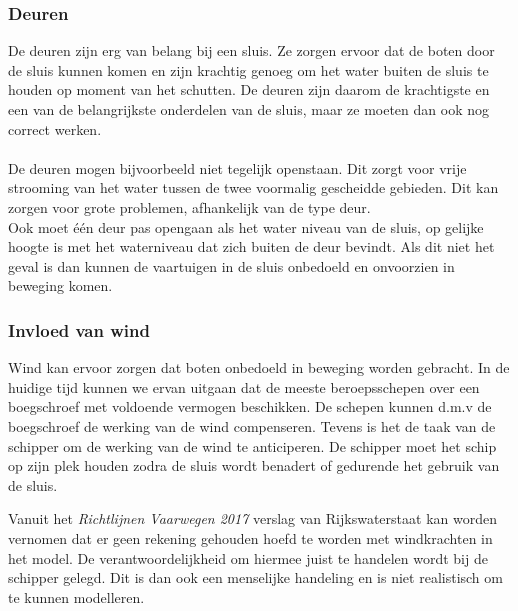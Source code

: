 \documentclass{article}
\begin{document}
\subsubsection{Deuren}
De deuren zijn erg van belang bij een sluis. Ze zorgen ervoor dat de boten door de sluis kunnen komen en zijn krachtig genoeg om het water buiten de sluis te houden op moment van het schutten. De deuren zijn daarom de krachtigste en een van de belangrijkste onderdelen van de sluis, maar ze moeten dan ook nog correct werken.
\\\\
De deuren mogen bijvoorbeeld niet tegelijk openstaan. Dit zorgt voor vrije strooming van het water tussen de twee voormalig gescheidde gebieden. Dit kan zorgen voor grote problemen, afhankelijk van de type deur.\\
Ook moet één deur pas opengaan als het water niveau van de sluis, op gelijke hoogte is met het waterniveau dat zich buiten de deur bevindt. Als dit niet het geval is dan kunnen de vaartuigen in de sluis onbedoeld en onvoorzien in beweging komen.


\subsubsection{Invloed van wind} %
Wind kan ervoor zorgen dat boten onbedoeld in beweging worden gebracht. In de huidige tijd kunnen we ervan uitgaan dat de meeste beroepsschepen over een boegschroef  met voldoende vermogen beschikken. De schepen kunnen d.m.v de boegschroef de werking van de wind compenseren. Tevens is het de taak van de schipper om de werking van de wind te anticiperen. De schipper moet het schip op zijn plek houden zodra de sluis wordt benadert of gedurende het gebruik van de sluis.

Vanuit het \textit{Richtlijnen Vaarwegen 2017} verslag van Rijkswaterstaat \cite{rijkswaterstaat2017} kan worden vernomen dat er geen rekening gehouden hoefd te worden met windkrachten in het model. De verantwoordelijkheid om hiermee juist te handelen wordt bij de schipper gelegd. Dit is dan ook een menselijke handeling en is niet realistisch om te kunnen modelleren.

\vskip0.5cm
\end{document}
